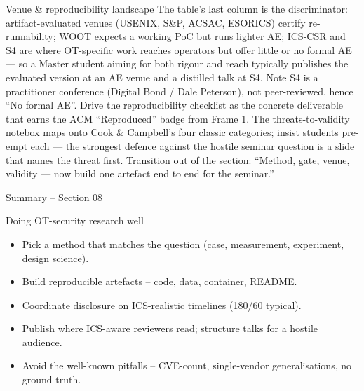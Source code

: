 \documentclass[aspectratio=169,11pt]{beamer}
\def\sectionNumber{08}
\begin{document}
\begin{frame}{Venue \& reproducibility landscape}
{  The table's last column is the discriminator: artifact-evaluated venues (USENIX, S\&P, ACSAC, ESORICS) certify re-runnability; WOOT expects a working PoC but runs lighter AE; ICS-CSR and S4 are where OT-specific work reaches operators but offer little or no formal AE --- so a Master student aiming for both rigour and reach typically publishes the evaluated version at an AE venue and a distilled talk at S4. Note S4 is a practitioner conference (Digital Bond / Dale Peterson), not peer-reviewed, hence ``No formal AE''. Drive the reproducibility checklist as the concrete deliverable that earns the ACM ``Reproduced'' badge from Frame 1. The threats-to-validity notebox maps onto Cook \& Campbell's four classic categories; insist students pre-empt each --- the strongest defence against the hostile seminar question is a slide that names the threat first. Transition out of the section: ``Method, gate, venue, validity --- now build one artefact end to end for the seminar.''
}
\end{frame}


\begin{frame}{Summary -- Section \sectionNumber}
\begin{takeawaybox}{Doing OT-security research well}
\begin{itemize}\setlength{\itemsep}{2pt}
  \item Pick a method that matches the question (case, measurement, experiment, design science).
  \item Build reproducible artefacts -- code, data, container, README.
  \item Coordinate disclosure on ICS-realistic timelines (180/60 typical).
  \item Publish where ICS-aware reviewers read; structure talks for a hostile audience.
  \item Avoid the well-known pitfalls -- CVE-count, single-vendor generalisations, no ground truth.
\end{itemize}
\end{takeawaybox}
\end{frame}
\end{document}
